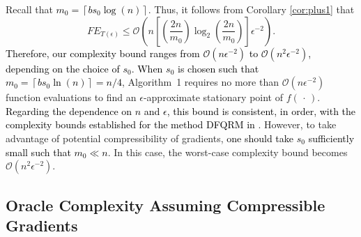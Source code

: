 \begin{remark}
Recall that \textcolor{black}{$m_{0}=\left\lceil b s_{0}\log(n)\right\rceil$}. Thus, it follows from Corollary \ref{cor:plus1} that 
\begin{equation*}
    FE_{T(\epsilon)}\leq\mathcal{O}\left(n\left[\left(\dfrac{2n}{m_{0}}\right)\log_{2}\left(\dfrac{2n}{m_{0}}\right)\right]\epsilon^{-2}\right).
\end{equation*}
\textcolor{black}{Therefore, our complexity bound ranges from \( \mathcal{O}(n\epsilon^{-2}) \) to \( \mathcal{O}(n^{2}\epsilon^{-2}) \), depending on the choice of \( s_0 \). When \( s_0 \) is chosen such that \( m_0 = \left\lceil b s_0 \ln(n) \right\rceil = n/4 \)}, Algorithm~1 requires no more than $\mathcal{O}\left(n\epsilon^{-2}\right)$ function evaluations to find an $\epsilon$-approximate stationary point of $f(\,\cdot\,)$.  \textcolor{black}{Regarding the dependence on $n$ and $\epsilon$, this bound is consistent, in order, with the complexity bounds established for the method DFQRM in  \cite{grapiglia2024quadratic}}. However, to take advantage of potential compressibility of gradients, \textcolor{black}{one should take $s_{0}$ sufficiently small such that $m_{0}\ll n$}. In this case, the worst-case complexity bound becomes $\mathcal{O}\left(n^{2}\epsilon^{-2}\right)$.
\end{remark}

\subsection{Oracle Complexity Assuming Compressible Gradients}

